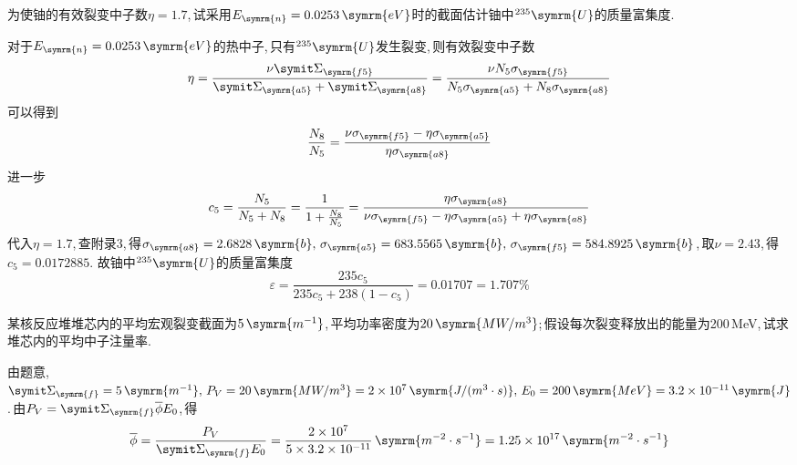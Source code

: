 \begin{exercise}
    为使铀的有效裂变中子数$\eta=1.7$,\,试采用$E_{\symrm{n}}=0.0253\,\symrm{eV}$时的截面估计铀中${}^{235}\symrm{U}$的质量富集度.\,
    \begin{solution}
        对于$E_{\symrm{n}}=0.0253\,\symrm{eV}$的热中子,\,只有${}^{235}\symrm{U}$发生裂变,\,则有效裂变中子数
        \begin{equation*}
            \eta = \frac{\nu \vSigma_{\symrm{f5}}}{\vSigma_{\symrm{a5}}+\vSigma_{\symrm{a8}}} = \frac{\nu N_5 \sigma_{\symrm{f5}}}{N_5 \sigma_{\symrm{a5}} + N_8 \sigma_{\symrm{a8}}}
        \end{equation*}
        可以得到
        \begin{equation*}
            \frac{N_8}{N_5} = \frac{\nu \sigma_{\symrm{f5}} - \eta \sigma_{\symrm{a5}}}{\eta \sigma_{\symrm{a8}}}
        \end{equation*}
        进一步
        \begin{equation*}
            c_5 = \frac{N_5}{N_5+N_8} = \frac{1}{1+\frac{N_8}{N_5}} = \frac{\eta \sigma_{\symrm{a8}}}{\nu \sigma_{\symrm{f5}} - \eta \sigma_{\symrm{a5}} + \eta \sigma_{\symrm{a8}}}
        \end{equation*}
        代入$\eta = 1.7$,\,查附录3,\,得$\sigma_{\symrm{a8}}=2.6828\,\symrm{b},\,\sigma_{\symrm{a5}}=683.5565\,\symrm{b},\,\sigma_{\symrm{f5}} = 584.8925\,\symrm{b}$,\,取$\nu = 2.43$,\,得$c_5 = 0.0172885$.
        故铀中${}^{235}\symrm{U}$的质量富集度
        \begin{equation*}
            \varepsilon = \frac{235c_5}{235c_5+238(1-c_5)} = 0.01707 = 1.707\%
        \end{equation*}
    \end{solution}
\end{exercise}

\begin{exercise}
    某核反应堆堆芯内的平均宏观裂变截面为$5\,\symrm{m^{-1}}$,\,平均功率密度为$20\,\symrm{MW/m^3}$;\,假设每次裂变释放出的能量为200\,MeV,\,试求堆芯内的平均中子注量率.\,
    \begin{solution}
        由题意,\,$\vSigma_{\symrm{f}} = 5\,\symrm{m^{-1}},\,P_V = 20\,\symrm{MW/m^3} = 2\times 10^7\,\symrm{J/(m^3 \cdot s)},\,E_0 = 200\,\symrm{MeV} = 3.2\times 10^{-11}\,\symrm{J}$.\,由$P_V = \vSigma_{\symrm{f}} \overline{\phi} E_0$,\,得
        \begin{equation*}
            \overline{\phi} = \frac{P_V}{\vSigma_{\symrm{f}} E_0} = \frac{2\times 10^7}{5\times 3.2\times 10^{-11}}\,\symrm{m^{-2}\cdot s^{-1}} = 1.25 \times 10^{17}\,\symrm{m^{-2}\cdot s^{-1}}
        \end{equation*}
    \end{solution}
\end{exercise}

